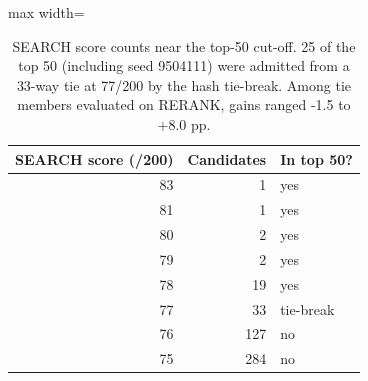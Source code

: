 \begin{table}[t]
\centering
\small
\begin{adjustbox}{max width=\linewidth}
\begin{tabular}{rrl}
\toprule
SEARCH score (/200) & Candidates & In top 50? \\
\midrule
83 & 1 & yes \\
81 & 1 & yes \\
80 & 2 & yes \\
79 & 2 & yes \\
78 & 19 & yes \\
77 & 33 & tie-break \\
76 & 127 & no \\
75 & 284 & no \\
\bottomrule
\end{tabular}
\end{adjustbox}
\caption{SEARCH score counts near the top-50 cut-off. 25 of the top 50 (including seed 9504111) were admitted from a 33-way tie at 77/200 by the hash tie-break. Among tie members evaluated on RERANK, gains ranged -1.5 to +8.0 pp.}
\label{tab:tie}
\end{table}
